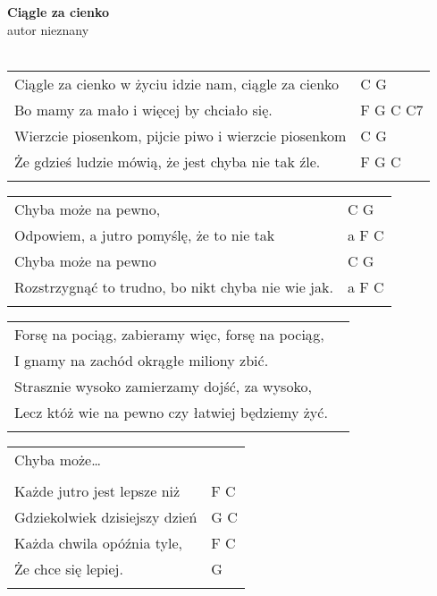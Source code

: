 \documentclass[a5paper]{article}
\begin{document}


\noindent
\fontsize{12pt}{15pt}\selectfont
\textbf{Ciągle za cienko} \\
\fontsize{8pt}{10pt}\selectfont
autor nieznany \\ \\
\fontsize{10pt}{12pt}\selectfont
{}
\begin{tabular}{@{}p{9.00cm}p{3cm}@{}}
\noindent
Ciągle za cienko w życiu idzie nam, ciągle za cienko & C G \\
Bo mamy za mało i więcej by chciało się. &  F G C C7 \\
Wierzcie piosenkom, pijcie piwo i wierzcie piosenkom & C G \\
Że gdzieś ludzie mówią, że jest chyba nie tak źle. & F G C \\ \\
\end{tabular}

\noindent
\begin{tabular}{@{}p{8.00cm}p{3cm}@{}}
Chyba może na pewno, & C G \\
Odpowiem, a jutro pomyślę, że to nie tak & a F C \\
Chyba może na pewno & C G \\
Rozstrzygnąć to trudno, bo nikt chyba nie wie jak. & a F C \\ \\
\end{tabular}

\noindent
\begin{tabular}{@{}p{8.00cm}p{3cm}@{}}
Forsę na pociąg, zabieramy więc, forsę na pociąg, \\
I gnamy na zachód okrągłe miliony zbić. \\
Strasznie wysoko zamierzamy dojść, za wysoko, \\
Lecz któż wie na pewno czy łatwiej będziemy żyć. \\ \\
\end{tabular} 

\noindent
\begin{tabular}{@{}p{8.00cm}p{3cm}@{}}
Chyba może… \\ \\

Każde jutro jest lepsze niż & F C \\
Gdziekolwiek dzisiejszy dzień & G C \\
Każda chwila opóźnia tyle, & F C \\
Że chce się lepiej. & G \\ \\
\end{tabular}
\end{document}
